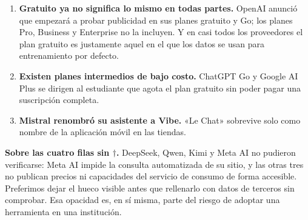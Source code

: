 \documentclass[a4paper,10pt]{article}
\begin{document}
\begin{enumerate}
  \item \textbf{Gratuito ya no significa lo mismo en todas partes.} OpenAI anunció que empezará a
  probar publicidad en sus planes gratuito y Go; los planes Pro, Business y Enterprise no la
  incluyen. Y en casi todos los proveedores el plan gratuito es justamente aquel en el que los datos
  se usan para entrenamiento por defecto.
  \item \textbf{Existen planes intermedios de bajo costo.} ChatGPT Go y Google AI Plus se dirigen al
  estudiante que agota el plan gratuito sin poder pagar una suscripción completa.
  \item \textbf{Mistral renombró su asistente a Vibe.} «Le Chat» sobrevive solo como nombre de la
  aplicación móvil en las tiendas.
\end{enumerate}

\vspace{0.3cm}

\noindent\textbf{Sobre las cuatro filas sin $\dagger$.} DeepSeek, Qwen, Kimi y Meta AI no pudieron
verificarse: Meta AI impide la consulta automatizada de su sitio, y las otras tres no publican
precios ni capacidades del servicio de consumo de forma accesible. Preferimos dejar el hueco visible
antes que rellenarlo con datos de terceros sin comprobar. Esa opacidad es, en sí misma, parte del
riesgo de adoptar una herramienta en una institución.
\end{document}
